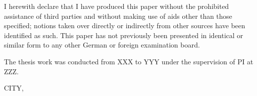 


\begin{declaration}        %

I herewith declare that I have produced this paper without the prohibited assistance of third parties and without making use of aids other than those specified; notions taken over directly or indirectly from other sources have been identified as such. This paper has not previously been presented in identical or similar form to any other German or foreign examination board.

The thesis work was conducted from XXX to YYY under the supervision of PI at ZZZ.

\vspace{10mm}

CITY,


\end{declaration}


